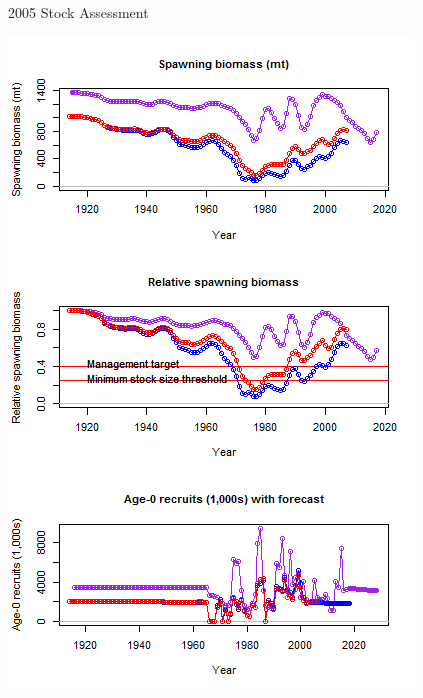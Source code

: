 \documentclass[ignorenonframetext,compress]{beamer}
\def\endcol{\end{column}}
\def\endcols{\end{columns}}
\begin{document}

\begin{frame}{2005 Stock Assessment}

\includegraphics{Figures/bridge_timeseries.png}

\end{frame}
\end{document}
